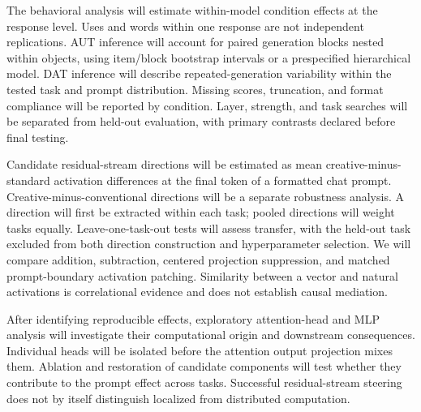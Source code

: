 \documentclass{article}
\begin{document}

The behavioral analysis will estimate within-model condition effects at the response level. Uses and words within one response are not independent replications. AUT inference will account for paired generation blocks nested within objects, using item/block bootstrap intervals or a prespecified hierarchical model. DAT inference will describe repeated-generation variability within the tested task and prompt distribution. Missing scores, truncation, and format compliance will be reported by condition. Layer, strength, and task searches will be separated from held-out evaluation, with primary contrasts declared before final testing.

Candidate residual-stream directions will be estimated as mean creative-minus-standard activation differences at the final token of a formatted chat prompt. Creative-minus-conventional directions will be a separate robustness analysis. A direction will first be extracted within each task; pooled directions will weight tasks equally. Leave-one-task-out tests will assess transfer, with the held-out task excluded from both direction construction and hyperparameter selection. We will compare addition, subtraction, centered projection suppression, and matched prompt-boundary activation patching. Similarity between a vector and natural activations is correlational evidence and does not establish causal mediation.

After identifying reproducible effects, exploratory attention-head and MLP analysis will investigate their computational origin and downstream consequences. Individual heads will be isolated before the attention output projection mixes them. Ablation and restoration of candidate components will test whether they contribute to the prompt effect across tasks. Successful residual-stream steering does not by itself distinguish localized from distributed computation.
\end{document}
